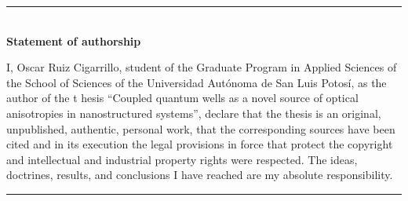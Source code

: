 \cleardoublepage
\begin{vcentrepage}

	\noindent\rule[2pt]{\textwidth}{0.8pt}\\
	{\large\textbf{Statement of authorship }}
	\begin{center}
		\justifying
		I, Oscar Ruiz Cigarrillo, student of the Graduate Program in Applied Sciences of the
		School of Sciences of the Universidad Aut\'onoma de San Luis Potos\'i, as the author of the
t		hesis ``Coupled quantum wells as a novel source of optical anisotropies in nanostructured
		systems'', declare that the thesis is an original, unpublished, authentic, personal work, that
		the corresponding sources have been cited and in its execution the legal provisions
		in force that protect the copyright and intellectual and industrial property rights were
		respected. The ideas, doctrines, results, and conclusions I have reached are my absolute
		responsibility.
	\end{center}
	\noindent\rule[2pt]{\textwidth}{0.8pt}

\end{vcentrepage}

%